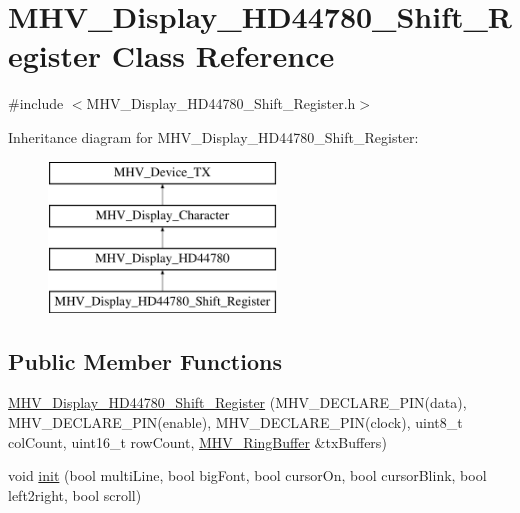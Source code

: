 \hypertarget{class_m_h_v___display___h_d44780___shift___register}{
\section{\-M\-H\-V\-\_\-\-Display\-\_\-\-H\-D44780\-\_\-\-Shift\-\_\-\-Register \-Class \-Reference}
\label{class_m_h_v___display___h_d44780___shift___register}
}


{\ttfamily \#include $<$\-M\-H\-V\-\_\-\-Display\-\_\-\-H\-D44780\-\_\-\-Shift\-\_\-\-Register.\-h$>$}

\-Inheritance diagram for \-M\-H\-V\-\_\-\-Display\-\_\-\-H\-D44780\-\_\-\-Shift\-\_\-\-Register\-:\begin{figure}[H]
\begin{center}
\leavevmode
\includegraphics[height=4.000000cm]{class_m_h_v___display___h_d44780___shift___register}
\end{center}
\end{figure}
\subsection*{\-Public \-Member \-Functions}
\begin{DoxyCompactItemize}
\item 
\hyperlink{class_m_h_v___display___h_d44780___shift___register_a6affa0526013aa4ef9229bf4d324fd8d}{\-M\-H\-V\-\_\-\-Display\-\_\-\-H\-D44780\-\_\-\-Shift\-\_\-\-Register} (\-M\-H\-V\-\_\-\-D\-E\-C\-L\-A\-R\-E\-\_\-\-P\-I\-N(data), \-M\-H\-V\-\_\-\-D\-E\-C\-L\-A\-R\-E\-\_\-\-P\-I\-N(enable), \-M\-H\-V\-\_\-\-D\-E\-C\-L\-A\-R\-E\-\_\-\-P\-I\-N(clock), uint8\-\_\-t col\-Count, uint16\-\_\-t row\-Count, \hyperlink{class_m_h_v___ring_buffer}{\-M\-H\-V\-\_\-\-Ring\-Buffer} \&tx\-Buffers)
\item 
void \hyperlink{class_m_h_v___display___h_d44780___shift___register_acb15d889b37de1be9f0f0b45dd5308d7}{init} (bool multi\-Line, bool big\-Font, bool cursor\-On, bool cursor\-Blink, bool left2right, bool scroll)
\end{DoxyCompactItemize}
